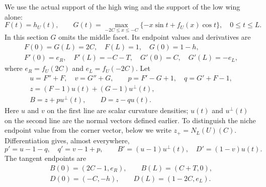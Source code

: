 We use the actual support of the high wing and the support of the
low wing alone:
\begin{equation}\label{eq:tilted-wing-supports}
 F(t)=h_U(t),\qquad
 G(t)=\max_{-2C\le x\le-C}
                 \{-x\sin t+f_U(x)\cos t\},\quad 0\le t\le L.
\end{equation}
In this section $G$ omits the middle facet. Its endpoint values
and derivatives are
\begin{equation}\label{eq:tilted-wing-traces}
 \begin{gathered}
 F(0)=G(L)=2C,\quad F(L)=1,\quad G(0)=1-h,\\
 F'(0)=e_R,\quad F'(L)=-C-T,\quad
 G'(0)=C,\quad G'(L)=-e_L,
 \end{gathered}
\end{equation}
where $e_R=f_U(2C)$ and $e_L=f_U(-2C)$.
Let
\begin{equation}\label{eq:tilted-contact-data}
 \begin{gathered}
 u=F''+F,\quad v=G''+G,\qquad p=F'-G+1,\quad q=G'+F-1,\\
 z=(F-1)u(t)+(G-1)u^\perp(t),\\
 B=z+p u^\perp(t),\qquad D=z-q u(t).
 \end{gathered}
\end{equation}
Here $u$ and $v$ on the first line are scalar curvature densities;
$u(t)$ and $u^\perp(t)$ on the second line are the normal vectors
defined earlier. To distinguish the niche endpoint value from the
corner vector, below we write $z_+=N_L(U)(C)$.
Differentiation gives, almost everywhere,
\begin{equation}\label{eq:tilted-contact-kinematics}
 p'=u-1-q,\quad q'=v-1+p,\qquad
 B'=(u-1)u^\perp(t),\quad D'=(1-v)u(t).
\end{equation}
The tangent endpoints are
\begin{equation}\label{eq:tilted-tangent-endpoints}
 \begin{gathered}
 B(0)=(2C-1,e_R),\qquad B(L)=(C+T,0),\\
 D(0)=(-C,-h),\qquad D(L)=(1-2C,e_L).
 \end{gathered}
\end{equation}

